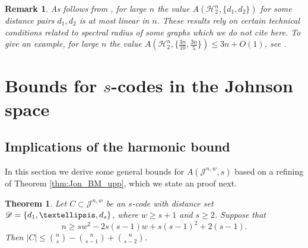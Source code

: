 \documentclass{amsart}
\newtheorem{theoremenv}[definitionenv]{Theorem}
\newtheorem{remarkenv}[definitionenv]{Remark}
\newenvironment{remark}{\begin{remarkenv}\rm}{\end{remarkenv}}
\newenvironment{theorem}{\begin{theoremenv}\rm}{\end{theoremenv}}
\newcommand{\cH}{\mathcal{H}}
\newcommand{\cJ}{\mathcal{J}}
\begin{document}
\begin{remark}
As follows from \cite{JTY+20}, for large $n$ the value $A(\cH_2^n,\{d_1,d_2\})$ for some distance pairs $d_1,d_2$ is at most linear in $n.$ These results rely on certain technical conditions related to spectral radius of some graphs which we do not cite here. To give an example, for large $n$ the value 
$A(\cH^n_2, \{\frac {3n} {10}, \frac {3n} 5\}) \leq 3n +O(1)$, see \cite[Thm.~1.12]{JTY+20}.


\end{remark}

\section{Bounds for \texorpdfstring{$s$}--codes in the Johnson space}

\subsection{Implications of the harmonic bound}
In this section we derive some general bounds for $A(\cJ^{n,w},s)$ based on a refining of Theorem \ref{thm:Jon_BM_upp}, which 
we state an proof next.
\begin{theorem}
\label{thm:Joh_general}
Let $C \subset \cJ^{n, w}$ be an $s$-code with distance set $\sD=\{d_{1}, \dots, d_{s}\}$, where $w \geq s+1$ and $s \geq 2$. Suppose that 
  \begin{equation}\label{eq:25}
  n \geq sw^{2}-2s(s-1)w+s(s-1)^{2}+2(s-1).
  \end{equation}
Then $|C| \leq \binom{n}{s}-\binom{n}{s-1}+\binom{n}{s-2}$.
\end{theorem}
\end{document}
